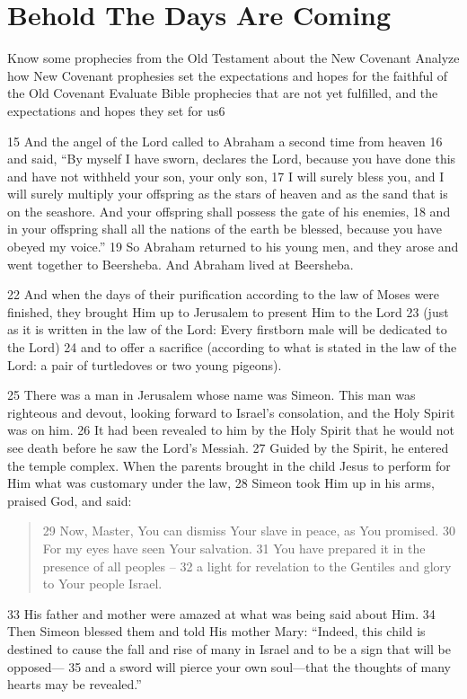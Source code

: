 \chapter{Behold The Days Are Coming}
\begin{goals}
\goal Know some prophecies from the Old Testament about the New Covenant
\goal Analyze how New Covenant prophesies set the expectations and hopes for the faithful of the Old Covenant
\goal Evaluate Bible prophecies that are not yet fulfilled, and the expectations and hopes they set for us6
\end{goals}
\begin{bible}


15 And the angel of the Lord called to Abraham a second time from heaven 16 and said, ``By myself I have sworn, declares the Lord, because you have done this and have not withheld your son, your only son, 17 I will surely bless you, and I will surely multiply your offspring as the stars of heaven and as the sand that is on the seashore. And your offspring shall possess the gate of his enemies, 18 and in your offspring shall all the nations of the earth be blessed, because you have obeyed my voice.'' 19 So Abraham returned to his young men, and they arose and went together to Beersheba. And Abraham lived at Beersheba.

22 And when the days of their purification according to the law of Moses were finished, they brought Him up to Jerusalem to present Him to the Lord 23 (just as it is written in the law of the Lord: Every firstborn male will be dedicated to the Lord) 24 and to offer a sacrifice (according to what is stated in the law of the Lord: a pair of turtledoves or two young pigeons).

25 There was a man in Jerusalem whose name was Simeon. This man was righteous and devout, looking forward to Israel's consolation, and the Holy Spirit was on him. 26 It had been revealed to him by the Holy Spirit that he would not see death before he saw the Lord's Messiah. 27 Guided by the Spirit, he entered the temple complex. When the parents brought in the child Jesus to perform for Him what was customary under the law, 28 Simeon took Him up in his arms, praised God, and said:
\begin{quote}
29 Now, Master, You can dismiss Your slave in peace, as You promised.
30 For my eyes have seen Your salvation.
31 You have prepared it in the presence of all peoples --
32 a light for revelation to the Gentiles and glory to Your people Israel.
\end{quote}
33 His father and mother were amazed at what was being said about Him. 34 Then Simeon blessed them and told His mother Mary: ``Indeed, this child is destined to cause the fall and rise of many in Israel and to be a sign that will be opposed— 35 and a sword will pierce your own soul—that the thoughts of many hearts may be revealed.''


\end{bible}
